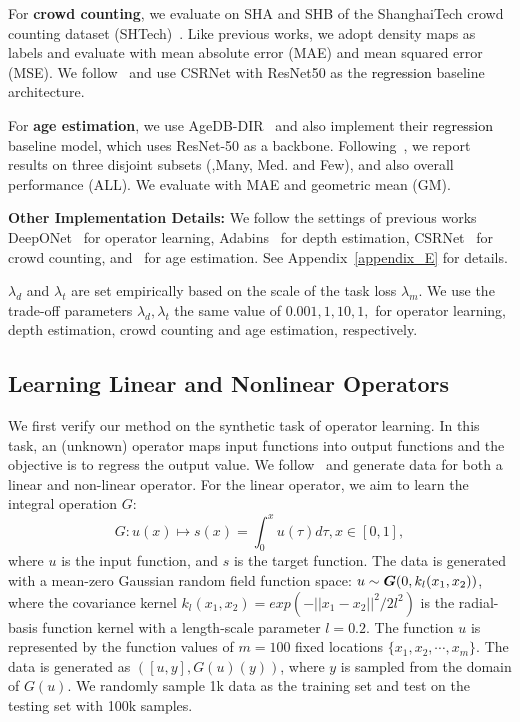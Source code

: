 \documentclass{article} %
\def\shihao{\textcolor{black}}
\begin{document}
For \textbf{crowd counting}, we evaluate on SHA and SHB of the ShanghaiTech crowd counting dataset (SHTech)~\citep{zhang2015cross}. Like previous works, we adopt density maps as labels and evaluate with mean absolute error (MAE) and mean squared error (MSE).  We follow~\cite{li2018csrnet} and use CSRNet with ResNet50 as the \shihao{regression} baseline architecture.

For \textbf{age estimation}, we use AgeDB-DIR~\citep{yang2021delving} and also implement their \shihao{regression} baseline model, which uses ResNet-50 as a backbone. Following~\cite{liu2019large}, we report results on three disjoint subsets (\ie,Many, Med. and Few), and also overall performance (\ie ALL). We evaluate with MAE and geometric mean (GM).


\textbf{Other Implementation Details:} We follow the settings of previous works DeepONet~\citep{lu2021learning} for operator learning, Adabins~\citep{bhat2021adabins} for depth estimation, CSRNet~\citep{li2018csrnet} for crowd counting, and~\cite{yang2021delving} for age estimation.  See Appendix~\ref{appendix_E} for details.

$\lambda_d$ and $\lambda_t$ are set empirically based on the scale of the task loss $\lambda_m$.  We use the trade-off parameters $\lambda_d, \lambda_t$ the same value of $0.001, 1, 10, 1, $ for operator learning, depth estimation, crowd counting and age estimation, respectively.


\subsection{Learning Linear and Nonlinear Operators}\label{sec:synthetic}

We first verify our {method} on the synthetic task of operator learning. In this task, an (unknown) operator maps input functions into output functions and the objective is to regress the output value.  We follow~\citep{lu2021learning} and generate data for both a linear and non-linear operator. For the linear operator, we aim to learn the integral operation $G$:
\begin{equation}
    G: u(x) \mapsto s(x) = \int_0^{x} u(\tau) d\tau, x\in [0,1],
\end{equation}
where $u$ is the input function, and $s$ is the target function. The data is generated with a mean-zero Gaussian random field function space: $u \sim {\bm{G}}(0, k_l(x_1, x_2))$, where the covariance kernel $k_l(x_1, x_2) = exp(-||x_1 -x_2||^2/2l^2)$ is the radial-basis function kernel with a length-scale parameter $l = 0.2$. The function $u$ is represented by the function values of $m=100$ fixed locations $\{x_1, x_2, \cdots, x_m\}$. 
The data is generated as $([u, y], G(u)(y))$, where $y$ is sampled from the domain of $G(u)$. We randomly sample 1k data as the training set and test on the testing set with 100k samples.
\end{document}
